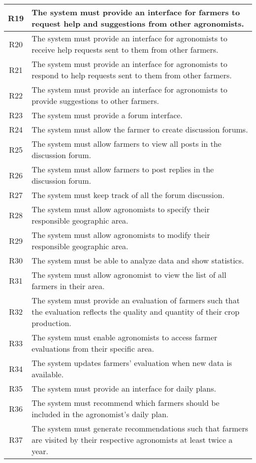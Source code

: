 \begin{center}
\begin{longtable}{|c|>{\raggedright\arraybackslash}m{15cm}|}
R19	& The system must provide an interface for farmers to request help and suggestions from other agronomists.\\\hline
R20	& The system must provide an interface for agronomists to receive help requests sent to them from other farmers.\\\hline
R21	& The system must provide an interface for agronomists to respond to help requests sent to them from other farmers.\\\hline
R22	& The system must provide an interface for agronomists to provide suggestions to other farmers.\\\hline
R23	& The system must provide a forum interface.\\\hline
R24	& The system must allow the farmer to create discussion forums.\\\hline
R25	& The system must allow farmers to view all posts in the discussion forum.\\\hline
R26	& The system must allow farmers to post replies in the discussion forum.\\\hline
R27	& The system must keep track of all the forum discussion.\\\hline
R28	& The system must allow agronomists to specify their responsible geographic area.\\\hline
R29	& The system must allow agronomists to modify their responsible geographic area.\\\hline 
R30	& The system must be able to analyze data and show statistics.\\\hline
R31	& The system must allow agronomist to view the list of all farmers in their area. \\\hline
R32	& The system must provide an evaluation of farmers such that the evaluation reflects the quality and quantity of their crop production.\\\hline
R33	& The system must enable agronomists to access farmer evaluations from their specific area.\\\hline
R34	& The system updates farmers' evaluation when new data is available.\\\hline %
R35	& The system must provide an interface for daily plans.\\\hline
R36	& The system must recommend which farmers should be included in the agronomist's daily plan.\\\hline
R37	& The system must generate recommendations such that farmers are visited by their respective agronomists at least twice a year.\\\hline

\end{longtable}
\end{center}
